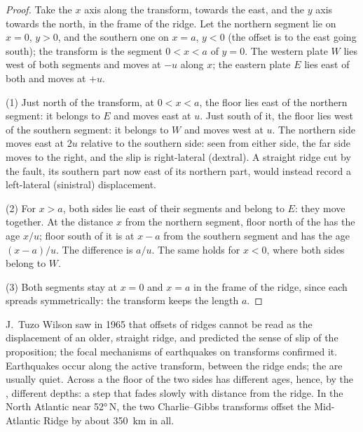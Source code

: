 \begin{proof}
Take the $x$ axis along the transform, towards the east, and the $y$ axis
towards the north, in the frame of the ridge. Let the northern segment lie on
$x = 0$, $y > 0$, and the southern one on $x = a$, $y < 0$ (the offset is to
the east going south); the transform is the segment $0 < x < a$ of $y = 0$. The
western plate $W$ lies west of both segments and moves at $-u$ along $x$; the
eastern plate $E$ lies east of both and moves at $+u$.

(1) Just north of the transform, at $0 < x < a$, the floor lies east of the
northern segment: it belongs to $E$ and moves east at $u$. Just south of it, the
floor lies west of the southern segment: it belongs to $W$ and moves west at
$u$. The northern side moves east at $2u$ relative to the southern side: seen
from either side, the far side moves to the right, and the slip is
right-lateral (dextral). A straight ridge cut by the fault, its southern part
now east of its northern part, would instead record a left-lateral (sinistral)
displacement.

(2) For $x > a$, both sides lie east of their segments and belong to $E$: they
move together. At the distance $x$ from the northern segment, floor north of
the  has the age $x/u$; floor south of it is at $x - a$ from the
southern segment and has the age $(x - a)/u$. The difference is $a/u$. The same
holds for $x < 0$, where both sides belong to $W$.

(3) Both segments stay at $x = 0$ and $x = a$ in the frame of the ridge, since
each spreads symmetrically: the transform keeps the length $a$.
\end{proof}

J.\ Tuzo Wilson saw in 1965 that offsets of ridges cannot be read as the
displacement of an older, straight ridge, and predicted the sense of slip
of the proposition; the focal mechanisms of earthquakes on transforms
confirmed it. Earthquakes occur along the active transform, between the ridge
ends; the  are usually quiet. Across a
 the floor of the two sides has different ages, hence, by the
, different depths: a step that fades slowly with distance from
the ridge. In the North Atlantic near \ang{52}\,N, the two Charlie--Gibbs
transforms offset the Mid-Atlantic Ridge by about \qty{350}{km} in all.

